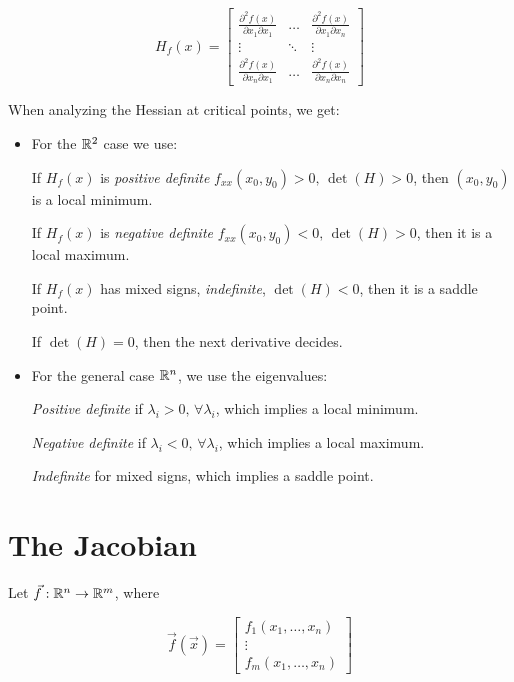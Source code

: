 \[
        H_f(x) = 
        \begin{bmatrix}
            \frac{\partial^2 f(x)}{\partial x_1 \partial x_1} & \dots & \frac{\partial^2 f(x)}{\partial x_1 \partial x_n} \\ 
            \vdots & \ddots & \vdots \\ 
            \frac{\partial^2 f(x)}{\partial x_n \partial x_1} & \dots & \frac{\partial^2 f(x)}{\partial x_n \partial x_n}
        \end{bmatrix}
\]


When analyzing the Hessian at critical points, we get:

\begin{itemize}
        
    \item For the \(\mathbb{R}^2\) case we use:

        \subitem If \( H_f(x)\) is \emph{positive definite} \(f_{xx}(x_0, y_0) > 0,\, \det(H) > 0\), then \((x_0, y_0)\) is a local minimum.

        \subitem If \( H_f(x)\) is \emph{negative definite} \(f_{xx}(x_0, y_0) < 0,\, \det(H) > 0 \), then it is a local maximum.

        \subitem If \( H_f(x) \) has mixed signs, \emph{indefinite}, \(\det(H) < 0\), then it is a saddle point.

        \subitem If \(\det(H) = 0\), then the next derivative decides.

    \item For the general case \(\mathbb{R}^n\), we use the eigenvalues:

        \subitem \emph{Positive definite} if \(\lambda_i > 0,\, \forall \lambda_i\), which implies a local minimum.

        \subitem \emph{Negative definite} if \(\lambda_i < 0,\, \forall \lambda_i\), which implies a local maximum.

        \subitem \emph{Indefinite} for mixed signs, which implies a saddle point.

\end{itemize}

\section{The Jacobian}

Let \( \vec{f} : \mathbb{R}^n \to \mathbb{R}^m \), where

\[
    \vec{f}(\vec{x}) = \begin{bmatrix}
    f_1(x_1, \dots, x_n) \\
    \vdots \\
    f_m(x_1, \dots, x_n)
    \end{bmatrix}
\]

